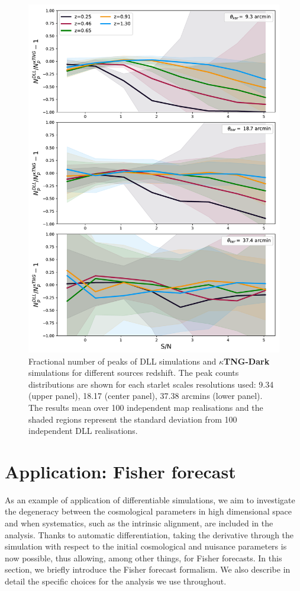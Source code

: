 \documentclass{aa}
\begin{document}
\begin{figure}
    \centering
    \includegraphics[width=\columnwidth]{paper/figures/res_peak_DLL_vs_ktng.pdf}
    \caption{Fractional number of peaks of DLL simulations and \textbf{$\kappa$TNG-Dark} simulations for different sources redshift. The peak counts distributions are shown for each starlet scales resolutions used: 9.34 (upper panel), 18.17 (center panel), 37.38 arcmins (lower panel).
  The results mean over 100 independent map realisations and the shaded regions represent the standard deviation from 100 independent DLL realisations.}
\end{figure}\label{peaks_z}


\section{Application: Fisher forecast
}\label{Application_Fisher_forecast_for_HOS}
As an example of application of differentiable simulations, we aim to investigate the degeneracy between the cosmological parameters in high dimensional space and when systematics, such as the intrinsic alignment, are included in the analysis. Thanks to automatic differentiation, 
taking the derivative through the simulation with respect to the initial cosmological and nuisance parameters is now possible, thus allowing, among other things, for Fisher forecasts.
In this section, we briefly introduce the Fisher forecast formalism. We also describe in detail the specific choices for the analysis we use throughout.
\end{document}
